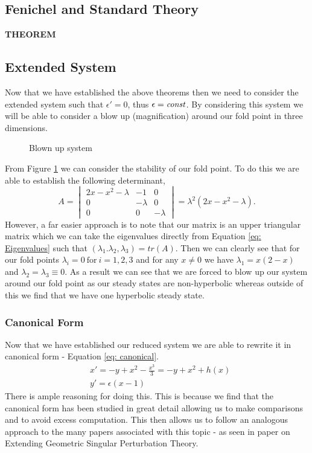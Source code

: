 \documentclass{article}
\newcommand{\st}{such that }
\begin{document}
\subsection{Fenichel and Standard Theory}
\textbf{THEOREM}

\subsection{Extended System}
Now that we have established the above theorems then we need to consider the extended system \st $\epsilon'=0$, thus $\epsilon=\text{\textit{const}}$. By considering this system we will be able to consider a blow up (magnification) around our fold point in three dimensions.  
\begin{figure}[h]
    \centering
    \caption{Blown up system}
    \label{fig: blow up}
\end{figure}
From Figure \ref{fig: blow up} we can consider the stability of our fold point. To do this we are able to establish the following determinant,
\begin{equation} 
    A=\begin{vmatrix} 2x-x^2-\lambda & -1&0 \\ 0 & -\lambda&0\\0&0&-\lambda \end{vmatrix}=\lambda^2(2x-x^2-\lambda).
    \label{eq: Eigenvalues}
\end{equation}
However, a far easier approach is to note that our matrix is an upper triangular matrix which we can take the eigenvalues directly from Equation \ref{eq: Eigenvalues} \st $(\lambda_1.\lambda_2,\lambda_3)=tr(A)$. Then we can clearly see that for our fold points $\lambda_i=0 \ \text{for} \ i=1,2,3$ and for any $x\neq0$ we have $\lambda_1=x(2-x)$ and $\lambda_2=\lambda_3\equiv0$. As a result we can see that we are forced to blow up our system around our fold point as our steady states are non-hyperbolic whereas outside of this we find that we have one hyperbolic steady state.


\subsubsection{Canonical Form}
Now that we have established our reduced system we are able to rewrite it in canonical form - Equation \ref{eq: canonical}.
\begin{equation}
    \begin{aligned}
        &x'=-y+x^2-\frac{x^3}{3}=-y+x^2+h(x) \\
        &y'=\epsilon(x-1)
    \end{aligned}
    \label{eq: canonical}
\end{equation}
There is ample reasoning for doing this. This is because we find that the canonical form has been studied in great detail allowing us to make comparisons and to avoid excess computation. This then allows us to follow an analogous approach to the many papers associated with this topic - as seen in \citet{krupa2001} paper on Extending Geometric Singular Perturbation Theory.
\end{document}
